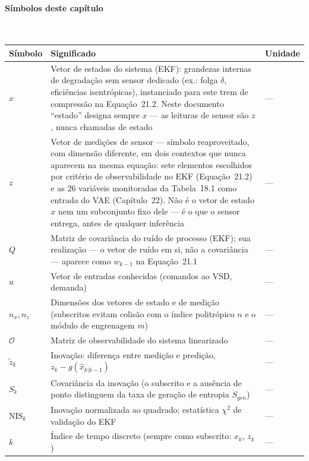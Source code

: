 \documentclass[12pt,a4paper]{article}
\numberwithin{equation}{section}
\numberwithin{table}{section}
\numberwithin{figure}{section}
\begin{document}
{\paragraph{Símbolos deste capítulo}\mbox{}\\[-0.5em]
{\small
\begin{longtable}{>{\raggedright\arraybackslash}p{2.6cm} >{\raggedright\arraybackslash}p{9.2cm} >{\raggedright\arraybackslash}p{2.6cm}}
	\toprule
	\textbf{Símbolo} & \textbf{Significado} & \textbf{Unidade} \\ \midrule
	\endhead
	$x$ & Vetor de estados do sistema (EKF): grandezas internas de degradação sem sensor dedicado (ex.: folga $\delta$, eficiências isentrópicas), instanciado para este trem de compressão na Equação~21.2. Neste documento ``estado'' designa sempre $x$ — as leituras de sensor são $z$, nunca chamadas de estado & --- \\
	$z$ & Vetor de medições de sensor — símbolo reaproveitado, com dimensão diferente, em dois contextos que nunca aparecem na mesma equação: sete elementos escolhidos por critério de observabilidade no EKF (Equação~21.2) e as 26 variáveis monitoradas da Tabela~18.1 como entrada do VAE (Capítulo~22). Não é o vetor de estado $x$ nem um subconjunto fixo dele — é o que o sensor entrega, antes de qualquer inferência & --- \\
	$Q$ & Matriz de covariância do ruído de processo (EKF); sua realização — o vetor de ruído em si, não a covariância — aparece como $w_{k-1}$ na Equação~21.1 & --- \\
	$u$ & Vetor de entradas conhecidas (comandos ao VSD, demanda) & --- \\
	$n_x, n_z$\dag & Dimensões dos vetores de estado e de medição (subscritos evitam colisão com o índice politrópico $n$ e o módulo de engrenagem $m$) & --- \\
	$\mathcal{O}$ & Matriz de observabilidade do sistema linearizado & --- \\
	$\tilde{z}_k$ & Inovação: diferença entre medição e predição, $z_k - g(\hat{x}_{k|k-1})$ & --- \\
	$S_k$\dag & Covariância da inovação (o subscrito e a ausência de ponto distinguem da taxa de geração de entropia $\dot{S}_{gen}$) & --- \\
	$\text{NIS}_k$ & Inovação normalizada ao quadrado; estatística $\chi^2$ de validação do EKF & --- \\
	$k$ & Índice de tempo discreto (sempre como subscrito: $x_k$, $z_k$) & --- \\
	\bottomrule
\end{longtable}
}

}
\end{document}

